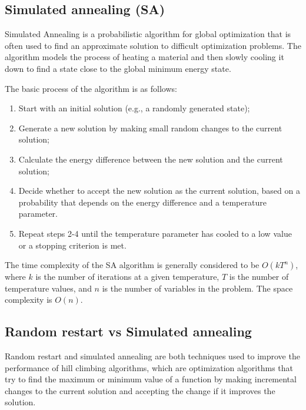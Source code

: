 \documentclass{article}
\begin{document}
\newpage

\subsection{Simulated annealing (SA)}

Simulated Annealing is a probabilistic algorithm for global optimization that is often used to find an approximate solution to difficult optimization problems. The algorithm models the process of heating a material and then slowly cooling it down to find a state close to the global minimum energy state.

The basic process of the algorithm is as follows:

\begin{enumerate}
    \item Start with an initial solution (e.g., a randomly generated state);
    \item Generate a new solution by making small random changes to the current solution;
    \item Calculate the energy difference between the new solution and the current solution;
    \item Decide whether to accept the new solution as the current solution, based on a probability that depends on the energy difference and a temperature parameter.
    \item Repeat steps 2-4 until the temperature parameter has cooled to a low value or a stopping criterion is met.
\end{enumerate}

The time complexity of the SA algorithm is generally considered to be $O(kT^n)$, where $k$ is the number of iterations at a given temperature, $T$ is the number of temperature values, and $n$ is the number of variables in the problem. The space complexity is $O(n)$.

\newpage

\subsection{Random restart vs Simulated annealing}

Random restart and simulated annealing are both techniques used to improve the performance of hill climbing algorithms, which are optimization algorithms that try to find the maximum or minimum value of a function by making incremental changes to the current solution and accepting the change if it improves the solution. \\
\end{document}
